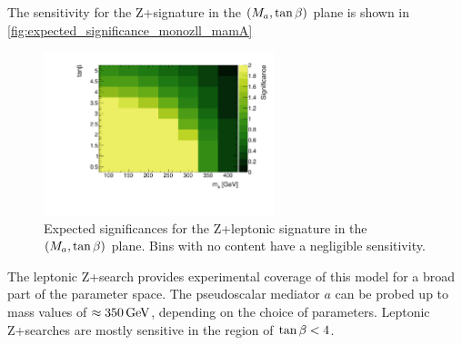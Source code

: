
The sensitivity for the Z+\MET signature in the $(M_{a},\tan\beta)$ plane is shown in \autoref{fig:expected_significance_monozll_mamA} 

\begin{figure}
\centering
\includegraphics[width=0.6\textwidth]{texinputs/04_grid/figures/monoz/leptonic/tanbma_Significance_ll.pdf}
\caption{Expected significances for the Z+\MET leptonic signature in the $(M_{a},\tan\beta)$ plane. Bins with no content have a negligible sensitivity.} 
\label{fig:expected_significance_monozll_mamA}
\end{figure}


The leptonic Z+\MET search provides experimental coverage of this model for a broad part of the parameter space. The pseudoscalar mediator $a$ can be probed up to mass values of $\approx\unit[350]{GeV}$, depending on the choice of parameters. Leptonic Z+\MET searches are mostly sensitive in the region of $\tan\beta<4$. 

